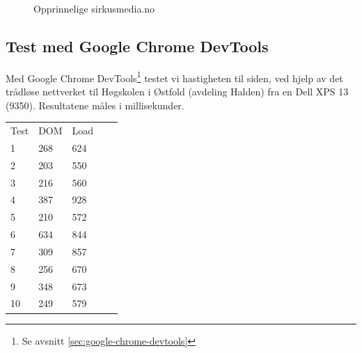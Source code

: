 \begin{figure}[H]
    \begin{center}
        \label{fig:analysis-current-sirkusmedia.no}
        \caption{Opprinnelige sirkusmedia.no}
    \end{center}
\end{figure}

\subsection{Test med Google Chrome DevTools}

Med Google Chrome DevTools\footnote{Se avsnitt \ref{sec:google-chrome-devtools}} testet vi hastigheten til siden, ved hjelp av det trådløse nettverket til Høgskolen i Østfold (avdeling Halden) fra en Dell XPS 13 (9350).
Resultatene måles i millisekunder.

\begin{table}[H]
\begin{tabular}{lllll}
Test & DOM & Load &  &  \\
1 & 268 & 624 &  &  \\
2 & 203 & 550 &  &  \\
3 & 216 & 560 &  &  \\
4 & 387 & 928 &  &  \\
5 & 210 & 572 &  &  \\
6 & 634 & 844 &  &  \\
7 & 309 & 857 &  &  \\
8 & 256 & 670 &  &  \\
9 & 348 & 673 &  &  \\
10 & 249 & 579 &  &  \\
\end{tabular}
\end{table}

